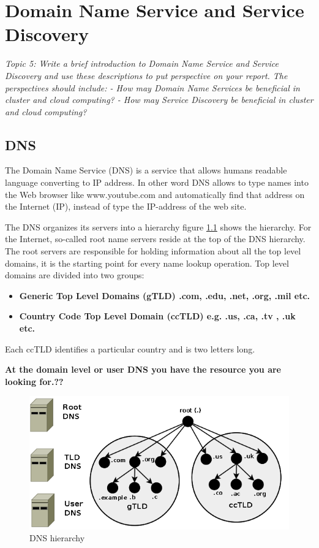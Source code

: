 \chapter{Domain Name Service and Service Discovery}\label{ch:dns}
\textit{Topic 5: Write a brief introduction to Domain Name Service and Service Discovery and use these descriptions to put perspective on your report. The perspectives should include:
	- How may Domain Name Services be beneficial in cluster and cloud computing?
	- How may Service Discovery be beneficial in cluster and cloud computing?}
\section{DNS}
The Domain Name Service (DNS) is a service that allows humans readable language converting to IP address. In other word DNS allows to type names into the Web browser like www.youtube.com and automatically find that address on the Internet (IP), instead of type the IP-address of the web site.

The DNS organizes its servers into a hierarchy figure \ref{fig:DNShierarchy} shows the hierarchy. For the Internet, so-called root name servers reside at the top of the DNS hierarchy. The root servers are responsible for holding information about all the top level domains, it is the starting point for every name lookup operation. Top level domains are divided into two groups:

\begin{itemize}
	\item \textbf{Generic Top Level Domains (gTLD) .com, .edu, .net, .org, .mil etc.}
	\item \textbf{ Country Code Top Level Domain (ccTLD) e.g. .us, .ca, .tv , .uk etc.}
\end{itemize}
Each ccTLD identifies a particular country and is two letters long.   

\textbf{At the domain level or user DNS you have the resource you are looking for.??
}

\begin{figure}[bth]
	\includegraphics[width=1\linewidth]{gfx/DNShierarchy}
	\caption[routingtable]{DNS hierarchy} \label{fig:DNShierarchy}
\end{figure}

